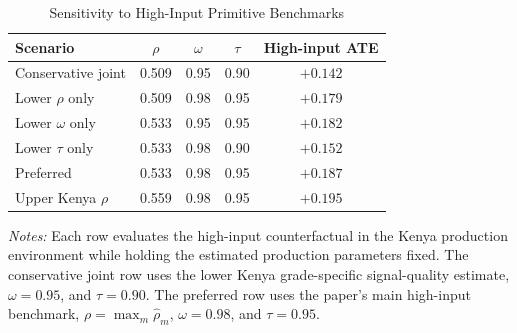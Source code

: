 \begin{table}[H]
\centering
\caption{Sensitivity to High-Input Primitive Benchmarks}
\label{tab:struct_primitive_sensitivity}
\begin{threeparttable}
\begin{tabular}[t]{lcccc}
\toprule
Scenario & $\rho$ & $\omega$ & $\tau$ & High-input ATE \\
\midrule
Conservative joint & 0.509 & 0.95 & 0.90 & $+0.142$ \\
Lower $\rho$ only & 0.509 & 0.98 & 0.95 & $+0.179$ \\
Lower $\omega$ only & 0.533 & 0.95 & 0.95 & $+0.182$ \\
Lower $\tau$ only & 0.533 & 0.98 & 0.90 & $+0.152$ \\
Preferred & 0.533 & 0.98 & 0.95 & $+0.187$ \\
Upper Kenya $\rho$ & 0.559 & 0.98 & 0.95 & $+0.195$ \\
\bottomrule
\end{tabular}
\begin{tablenotes}
\footnotesize
\item \textit{Notes:} Each row evaluates the high-input counterfactual in the Kenya production environment while holding the estimated production parameters fixed. The conservative joint row uses the lower Kenya grade-specific signal-quality estimate, $\omega=0.95$, and $\tau=0.90$. The preferred row uses the paper's main high-input benchmark, $\rho=\max_m \hat{\rho}_m$, $\omega=0.98$, and $\tau=0.95$.
\end{tablenotes}
\end{threeparttable}
\end{table}

